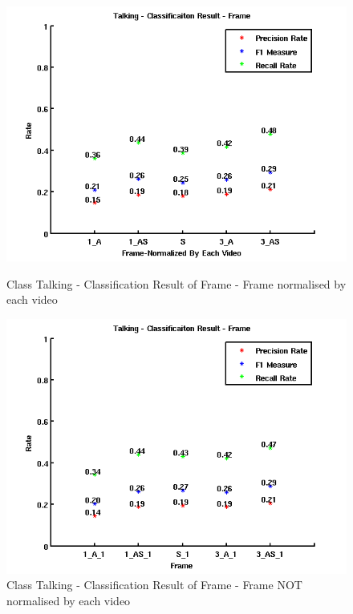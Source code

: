 \begin{figure}[ht]
\centering
\begin{minipage}{.5\textwidth}
  \centering
  \captionsetup{justification=centering, margin=1cm}
  \includegraphics[width=\linewidth]{imgs/Result_Talking_Frame.png}
  \caption{Class Talking - Classification Result of Frame - Frame normalised by each video}
  \label{fig:RTF}
\end{minipage}%
\begin{minipage}{.5\textwidth}
  \centering
  \captionsetup{justification=centering, margin=1cm}
  \includegraphics[width=\linewidth]{imgs/Result_Talking_Frame_1.png}
  \caption{Class Talking - Classification Result of Frame - Frame NOT normalised by each video}
  \label{fig:RTF1}
\end{minipage}
\end{figure}
